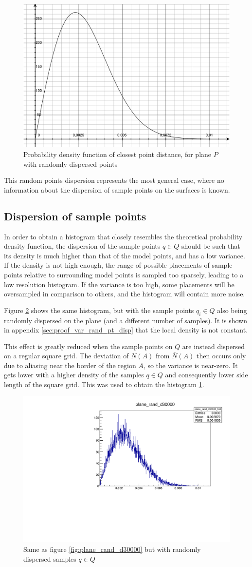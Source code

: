 \begin{figure}[h]
\centering
\includegraphics[width=.3\textwidth]{fig/plane_rand_d.pdf}
\caption{Probability density function of closest point distance, for plane $P$ with randomly dispersed points}
\label{fig:plane_rand_d}
\end{figure}

This random points dispersion represents the most general case, where no information about the dispersion of sample points on the surfaces is known. 

\FloatBarrier


\subsection{Dispersion of sample points} \label{sec:disp_sample_pts}
In order to obtain a histogram that closely resembles the theoretical probability density function, the dispersion of the sample points $q \in Q$ should be such that its density is much higher than that of the model points, and has a low variance. If the density is not high enough, the range of possible placements of sample points relative to surrounding model points is sampled too sparsely, leading to a low resolution histogram. If the variance is too high, some placements will be oversampled in comparison to others, and the histogram will contain more noise.

Figure \ref{fig:plane_rand_d30000_randQ} shows the same histogram, but with the sample points $q_i \in Q$ also being randomly dispersed on the plane (and a different number of samples). It is shown in appendix \ref{sec:proof_var_rand_pt_disp} that the local density is not constant.

This effect is greatly reduced when the sample points on $Q$ are instead dispersed on a regular square grid. The deviation of $N(A)$ from $\bar{N}(A)$ then occurs only due to aliasing near the border of the region $A$, so the variance is near-zero. It gets lower with a higher density of the samples $q \in Q$ and consequently lower side length of the square grid. This was used to obtain the histogram \ref{fig:plane_rand_d}.

\begin{figure}[h]
\centering
\includegraphics[width=.4\textwidth]{fig/plane_rand_d30000.pdf}
\caption{Same as figure \ref{fig:plane_rand_d30000} but with randomly dispersed samples $q \in Q$}
\label{fig:plane_rand_d30000_randQ}
\end{figure}


